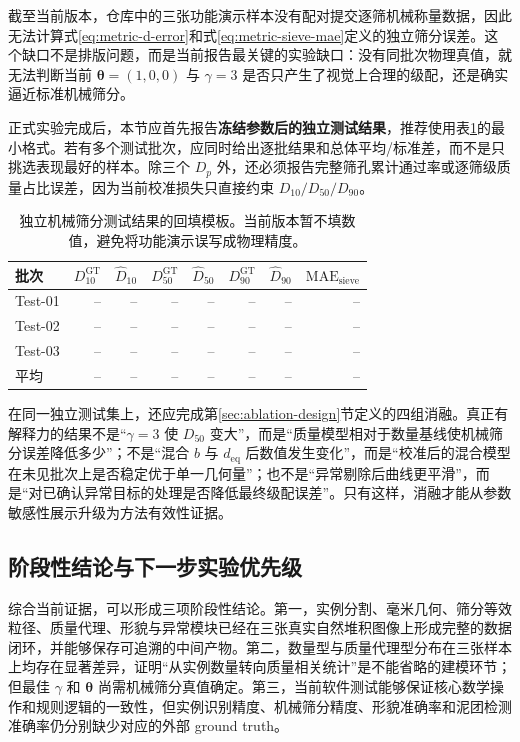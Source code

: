 截至当前版本，仓库中的三张功能演示样本没有配对提交逐筛机械称量数据，因此无法计算式\eqref{eq:metric-d-error}和式\eqref{eq:metric-sieve-mae}定义的独立筛分误差。这个缺口不是排版问题，而是当前报告最关键的实验缺口：没有同批次物理真值，就无法判断当前 $\boldsymbol{\theta}=(1,0,0)$ 与 $\gamma=3$ 是否只产生了视觉上合理的级配，还是确实逼近标准机械筛分。

正式实验完成后，本节应首先报告\textbf{冻结参数后的独立测试结果}，推荐使用表\ref{tab:physical-result-template}的最小格式。若有多个测试批次，应同时给出逐批结果和总体平均/标准差，而不是只挑选表现最好的样本。除三个 $D_p$ 外，还必须报告完整筛孔累计通过率或逐筛级质量占比误差，因为当前校准损失只直接约束 $D_{10}/D_{50}/D_{90}$。

\begin{table}[htbp]
\centering
\caption{独立机械筛分测试结果的回填模板。当前版本暂不填数值，避免将功能演示误写成物理精度。}
\label{tab:physical-result-template}
\small
\renewcommand{\arraystretch}{1.15}
\begin{tabular}{lrrrrrrr}
\toprule
批次 & $D_{10}^{\mathrm{GT}}$ & $\widehat D_{10}$ & $D_{50}^{\mathrm{GT}}$ & $\widehat D_{50}$ & $D_{90}^{\mathrm{GT}}$ & $\widehat D_{90}$ & $\mathrm{MAE}_{\mathrm{sieve}}$ \\
\midrule
Test-01 & -- & -- & -- & -- & -- & -- & -- \\
Test-02 & -- & -- & -- & -- & -- & -- & -- \\
Test-03 & -- & -- & -- & -- & -- & -- & -- \\
\midrule
平均 & -- & -- & -- & -- & -- & -- & -- \\
\bottomrule
\end{tabular}
\end{table}

在同一独立测试集上，还应完成第\ref{sec:ablation-design}节定义的四组消融。真正有解释力的结果不是“$\gamma=3$ 使 $D_{50}$ 变大”，而是“质量模型相对于数量基线使机械筛分误差降低多少”；不是“混合 $b$ 与 $d_{\mathrm{eq}}$ 后数值发生变化”，而是“校准后的混合模型在未见批次上是否稳定优于单一几何量”；也不是“异常剔除后曲线更平滑”，而是“对已确认异常目标的处理是否降低最终级配误差”。只有这样，消融才能从参数敏感性展示升级为方法有效性证据。

\subsection{阶段性结论与下一步实验优先级}
\label{sec:interim-results-conclusion}

综合当前证据，可以形成三项阶段性结论。第一，实例分割、毫米几何、筛分等效粒径、质量代理、形貌与异常模块已经在三张真实自然堆积图像上形成完整的数据闭环，并能够保存可追溯的中间产物。第二，数量型与质量代理型分布在三张样本上均存在显著差异，证明“从实例数量转向质量相关统计”是不能省略的建模环节；但最佳 $\gamma$ 和 $\boldsymbol{\theta}$ 尚需机械筛分真值确定。第三，当前软件测试能够保证核心数学操作和规则逻辑的一致性，但实例识别精度、机械筛分精度、形貌准确率和泥团检测准确率仍分别缺少对应的外部 ground truth。

